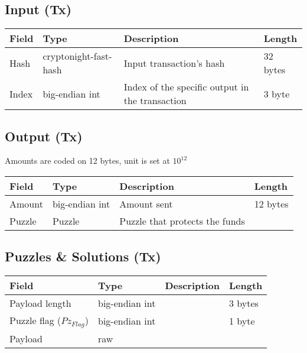 \documentclass[a4paper,10pt]{article}
\begin{document}
        
        \subsection{Input (Tx)}
            \begin{tabularx}{\textwidth}{|l|l|X|l|}
            \hline Field & Type & Description & Length \\ \hline
            \hline Hash & cryptonight-fast-hash & Input transaction's hash & 32 bytes \\
            \hline Index & big-endian int & Index of the specific output in the transaction & 3 byte \\
            \hline 
            \end{tabularx}

        \subsection{Output (Tx)}
            Amounts are coded on 12 bytes, unit is set at $10^{12}$ \\
            
            \begin{tabularx}{\textwidth}{|l|l|X|l|}
            \hline Field & Type & Description & Length \\ \hline
            \hline Amount & big-endian int & Amount sent & 12 bytes \\
            \hline Puzzle & Puzzle & Puzzle that protects the funds & \\
            \hline 
            \end{tabularx}

        \subsection{Puzzles \& Solutions (Tx)}
            \begin{tabularx}{\textwidth}{|l|l|X|l|}
            \hline Field & Type & Description & Length \\ \hline
            \hline Payload length & big-endian int &  & 3 bytes \\
            \hline Puzzle flag (${Pz}_{Flag}$) & big-endian int &  & 1 byte \\
            \hline Payload & raw & & \\
            \hline
            \end{tabularx}
\end{document}
